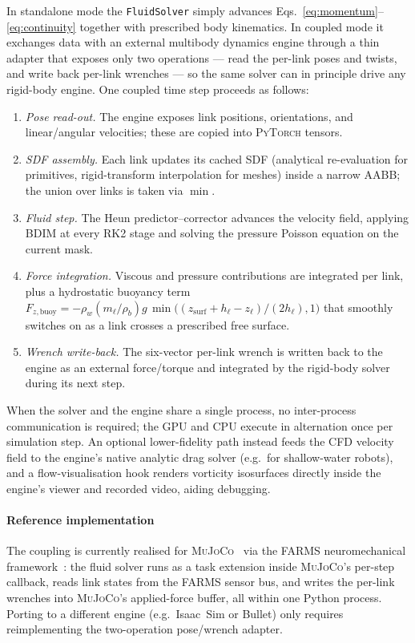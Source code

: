\documentclass[journal,twoside,10pt]{IEEEtran}
\newcommand{\farms}{\textsc{FARMS}\xspace}
\newcommand{\mujoco}{\textsc{MuJoCo}\xspace}
\newcommand{\pytorch}{\textsc{PyTorch}\xspace}
\begin{document}
In standalone mode the \texttt{FluidSolver} simply advances
Eqs.~\eqref{eq:momentum}--\eqref{eq:continuity} together with
prescribed body kinematics.  In coupled mode it exchanges data with an
external multibody dynamics engine through a thin adapter that exposes
only two operations --- read the per-link poses and twists, and write
back per-link wrenches --- so the same solver can in principle drive
any rigid-body engine.  One coupled time step proceeds as follows:
\begin{enumerate}
\item \emph{Pose read-out.}  The engine exposes link positions,
      orientations, and linear/angular velocities; these are copied
      into \pytorch tensors.
\item \emph{SDF assembly.}  Each link updates its cached SDF
      (analytical re-evaluation for primitives, rigid-transform
      interpolation for meshes) inside a narrow AABB; the union
      over links is taken via $\min$.
\item \emph{Fluid step.}  The Heun predictor--corrector advances the
      velocity field, applying BDIM at every RK2 stage and solving
      the pressure Poisson equation on the current mask.
\item \emph{Force integration.}  Viscous and pressure contributions
      are integrated per link, plus a hydrostatic buoyancy term
      $F_{z,\mathrm{buoy}}=-\rho_w (m_\ell/\rho_b) g\,
      \min\!\bigl((z_\mathrm{surf}+h_\ell-z_\ell)/(2h_\ell),1\bigr)$
      that smoothly switches on as a link crosses a prescribed free
      surface.
\item \emph{Wrench write-back.}  The six-vector per-link wrench is
      written back to the engine as an external force/torque and
      integrated by the rigid-body solver during its next step.
\end{enumerate}
When the solver and the engine share a single process, no
inter-process communication is required; the GPU and CPU execute in
alternation once per simulation step.  An optional lower-fidelity path
instead feeds the CFD velocity field to the engine's native analytic
drag solver (e.g.\ for shallow-water robots), and a flow-visualisation
hook renders vorticity isosurfaces directly inside the engine's viewer
and recorded video, aiding debugging.

\paragraph{Reference implementation}  The coupling is currently
realised for \mujoco~\cite{todorov2012mujoco} via the \farms
neuromechanical framework~\cite{arreguit2023farms}: the fluid solver
runs as a task extension inside \mujoco's per-step callback, reads link
states from the \farms sensor bus, and writes the per-link wrenches into
\mujoco's applied-force buffer, all within one Python process.  Porting
to a different engine (e.g.\ Isaac~Sim or Bullet) only requires
reimplementing the two-operation pose/wrench adapter.
\end{document}
